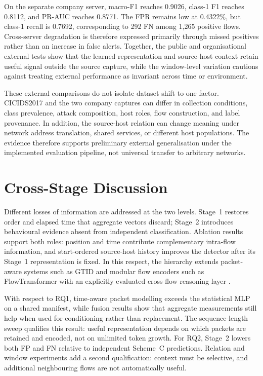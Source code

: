 \documentclass[11pt,fleqn]{report}
\begin{document}
On the separate company server, macro-F1 reaches 0.9026, class-1 F1 reaches 0.8112, and PR-AUC reaches 0.8771. The FPR remains low at 0.4322\%, but class-1 recall is 0.7692, corresponding to 292 FN among 1,265 positive flows. Cross-server degradation is therefore expressed primarily through missed positives rather than an increase in false alerts. Together, the public and organisational external tests show that the learned representation and source-host context retain useful signal outside the source capture, while the window-level variation cautions against treating external performance as invariant across time or environment.

These external comparisons do not isolate dataset shift to one factor. CICIDS2017 and the two company captures can differ in collection conditions, class prevalence, attack composition, host roles, flow construction, and label provenance. In addition, the source-host relation can change meaning under network address translation, shared services, or different host populations. The evidence therefore supports preliminary external generalisation under the implemented evaluation pipeline, not universal transfer to arbitrary networks.

\section{Cross-Stage Discussion}
\label{subsec:results_cross_stage_discussion}

Different losses of information are addressed at the two levels. Stage~1 restores order and elapsed time that aggregate vectors discard; Stage~2 introduces behavioural evidence absent from independent classification. Ablation results support both roles: position and time contribute complementary intra-flow information, and start-ordered source-host history improves the detector after its Stage~1 representation is fixed. In this respect, the hierarchy extends packet-aware systems such as GTID and modular flow encoders such as FlowTransformer with an explicitly evaluated cross-flow reasoning layer \cite{Han2023GTID,Manocchio2024FlowTransformer}.

With respect to RQ1, time-aware packet modelling exceeds the statistical MLP on a shared manifest, while fusion results show that aggregate measurements still help when used for conditioning rather than replacement. The sequence-length sweep qualifies this result: useful representation depends on which packets are retained and encoded, not on unlimited token growth. For RQ2, Stage~2 lowers both FP and FN relative to independent Scheme~C predictions. Relation and window experiments add a second qualification: context must be selective, and additional neighbouring flows are not automatically useful.
\end{document}
